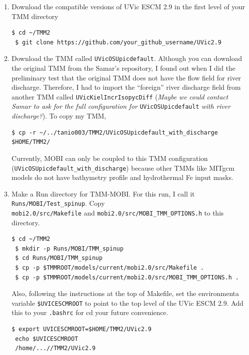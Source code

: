 \documentclass[a4paper]{article}
\def\noin{\noindent }
\begin{document}
\begin{enumerate}

\item Download the compatible versions of UVic ESCM 2.9 in the first level of your TMM directory
\begin{lstlisting}[style=DOS]
 $ cd ~/TMM2
 $ git clone https://github.com/your_github_username/UVic2.9
\end{lstlisting}

\item Download the TMM called \verb|UVicOSUpicdefault|. Although you can download the original TMM from the Samar's repository, I found out when I did the preliminary test that the original TMM does not have the flow field for river discharge. Therefore, I had to import the ``foreign'' river discharge field from another TMM called  \verb|UVicKielIncrIsopycDiff| (\emph{Maybe we could contact Samar to ask for the full configuration for} \verb|UVicOSUpicdefault| \emph{with river discharge?}). To copy my TMM, 
\begin{lstlisting}[style=DOS]
 $ cp -r ~/../tanio003/TMM2/UVicOSUpicdefault_with_discharge $HOME/TMM2/
\end{lstlisting}

\noin Currently, MOBI can only be coupled to this TMM configuration (\verb|UVicOSUpicdefault_with_discharge|) because other TMMs like MITgcm models do not have bathymetry profile and hydrothermal Fe input masks.

\item Make a Run directory for TMM-MOBI. For this run, I call it \verb|Runs/MOBI/Test_spinup|. Copy \\ \verb|mobi2.0/src/Makefile| and \verb|mobi2.0/src/MOBI_TMM_OPTIONS.h| to this directory. 
\begin{lstlisting}[style=DOS]
 $ cd ~/TMM2
 $ mkdir -p Runs/MOBI/TMM_spinup
 $ cd Runs/MOBI/TMM_spinup
 $ cp -p $TMMROOT/models/current/mobi2.0/src/Makefile .
 $ cp -p $TMMROOT/models/current/mobi2.0/src/MOBI_TMM_OPTIONS.h . 
\end{lstlisting}
\noin Also, following the instructions at the top of Makefile, set the environmenta variable \verb|$UVICESCMROOT| to point to the top level of the UVic ESCM 2.9. Add this to your \verb|.bashrc| for cd your future convenience.
\begin{lstlisting}[style=DOS]
 $ export UVICESCMROOT=$HOME/TMM2/UVic2.9
 echo $UVICESCMROOT
 /home/...//TMM2/UVic2.9
\end{lstlisting}


\end{enumerate}
\end{document}

